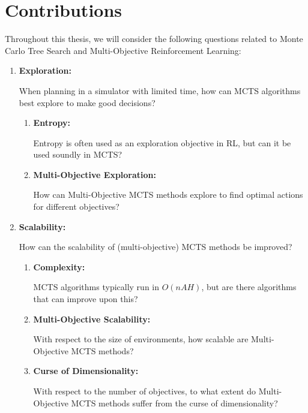 \section{Contributions}
\label{sec:1-2-contributions}


    Throughout this thesis, we will consider the following questions related to Monte Carlo Tree Search and Multi-Objective Reinforcement Learning:
    \begin{enumerate}[start=1, label={\textbf{Q\arabic* -}}]
        \item \hypertarget{q1}{\textbf{Exploration:}} When planning in a simulator with limited time, how can MCTS algorithms best explore to make good decisions?
        
        \begin{enumerate}[start=1, label={\textbf{Q1.\arabic* -}}]
            \item \hypertarget{q11}{\textbf{Entropy:}} Entropy is often used as an exploration objective in RL, but can it be used soundly in MCTS?
            \item \hypertarget{q12}{\textbf{Multi-Objective Exploration:}} How can Multi-Objective MCTS methods explore to find optimal actions for different objectives? 
        \end{enumerate}

        \item \hypertarget{q2}{\textbf{Scalability:}} How can the scalability of (multi-objective) MCTS methods be improved?

        \begin{enumerate}[start=1, label={\textbf{Q2.\arabic* -}}]
            \item \hypertarget{q21}{\textbf{Complexity:}} MCTS algorithms typically run in $O(nAH)$, but are there algorithms that can improve upon this?
            \item \hypertarget{q22}{\textbf{Multi-Objective Scalability:}} With respect to the size of environments, how scalable are Multi-Objective MCTS methods?
            \item \hypertarget{q23}{\textbf{Curse of Dimensionality:}} With respect to the number of objectives, to what extent do Multi-Objective MCTS methods suffer from the curse of dimensionality?
        \end{enumerate}



\end{enumerate}
